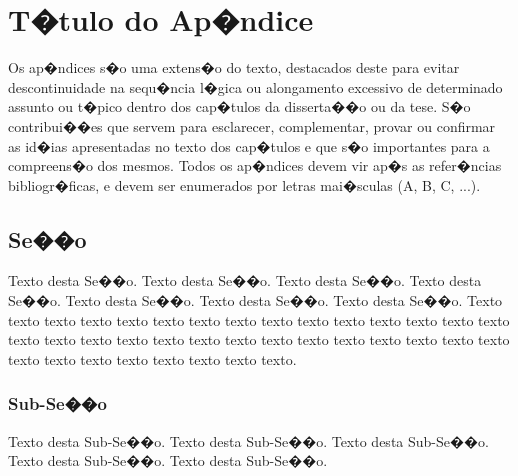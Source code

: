 \documentclass[msc, oneside]{ppgiathesis}
\begin{document}



\appendix

\chapter{T�tulo do Ap�ndice}

Os ap�ndices s�o uma extens�o do texto, destacados deste para
evitar descontinuidade na sequ�ncia l�gica ou alongamento
excessivo de determinado assunto ou t�pico dentro dos cap�tulos da
disserta��o ou da tese. S�o contribui��es que servem para
esclarecer, complementar, provar ou confirmar as id�ias
apresentadas no texto dos cap�tulos e que s�o importantes para a
compreens�o dos mesmos. Todos os ap�ndices devem vir ap�s as
refer�ncias bibliogr�ficas, e devem ser enumerados por letras
mai�sculas (A, B, C, ...).

\section{Se��o}

Texto desta Se��o. Texto desta Se��o. Texto desta Se��o. Texto
desta Se��o. Texto desta Se��o. Texto desta Se��o. Texto desta
Se��o. Texto texto texto texto texto texto texto texto texto texto
texto texto texto texto texto texto texto texto texto texto texto
texto texto texto texto texto texto texto texto texto texto texto
texto texto texto texto texto.

\subsection{Sub-Se��o}

Texto desta Sub-Se��o. Texto desta Sub-Se��o. Texto desta
Sub-Se��o. Texto desta Sub-Se��o. Texto desta Sub-Se��o.
\end{document}
